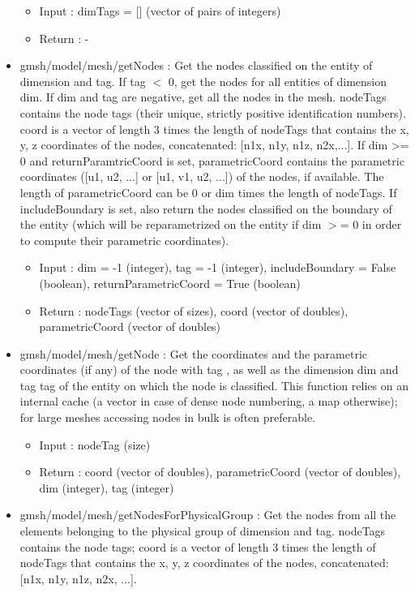 \documentclass[dvipdfmx, 9pt, a4paper]{article}
\numberwithin{equation}{section}
\begin{document}
\begin{itemize}
\begin{itemize}
\item Input : dimTags = [] (vector of pairs of integers)
\item Return : -
\end{itemize}
\item gmsh/model/mesh/getNodes : Get the nodes classified on the entity of dimension and tag. If tag $<$ 0, get the nodes for all entities of dimension dim. If dim and tag are negative, get all the nodes in the mesh. nodeTags contains the node tags (their unique, strictly positive
identification numbers). coord is a vector of length 3 times the length of nodeTags that contains the x, y, z coordinates of the nodes, concatenated: [n1x, n1y, n1z, n2x,...]. If dim >= 0 and returnParamtricCoord is set, parametricCoord contains the parametric coordinates ([u1, u2, ...] or [u1, v1, u2, ...]) of the nodes, if available. The length of parametricCoord can be 0 or dim times the length of nodeTags. If includeBoundary is set, also return the nodes classified on the boundary of the entity (which will be reparametrized on the entity if dim $>$= 0 in order to compute their parametric coordinates).
\begin{itemize}
\item Input : dim = -1 (integer), tag = -1 (integer), includeBoundary = False (boolean), returnParametricCoord = True (boolean)
\item Return : nodeTags (vector of sizes), coord (vector of doubles), parametricCoord (vector of doubles)
\end{itemize}
\item gmsh/model/mesh/getNode : Get the coordinates and the parametric coordinates (if any) of the node with tag , as well as the dimension dim and tag tag of the entity on which the node is classified. This function relies on an internal cache (a vector in case of dense
node numbering, a map otherwise); for large meshes accessing nodes in bulk is often preferable.
\begin{itemize}
\item Input : nodeTag (size)
\item Return : coord (vector of doubles), parametricCoord (vector of doubles), dim (integer), tag (integer)
\end{itemize}
\item gmsh/model/mesh/getNodesForPhysicalGroup : Get the nodes from all the elements belonging to the physical group of dimension and tag. nodeTags contains the node tags; coord is a vector of length 3 times the length of nodeTags that contains the x, y, z coordinates of the nodes, concatenated: [n1x, n1y, n1z, n2x, ...].

\end{itemize}
\end{document}
